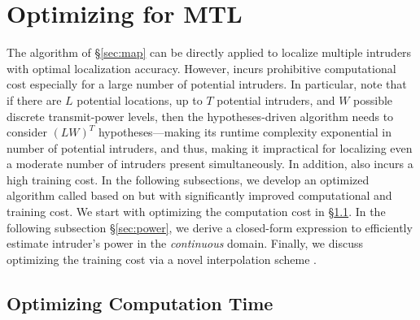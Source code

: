 \section{{\texorpdfstring{\ouralgo}: Optimizing \mll for MTL}}
\label{sec:map-time}
\label{sec:mtl}

The \map algorithm of \S\ref{sec:map} can be directly applied to
localize multiple intruders with optimal localization accuracy.
However, \map incurs prohibitive computational cost especially for a
large number of potential intruders.  In particular, note that if
there are $L$ potential locations, up to $T$ potential intruders, and
$W$ possible discrete transmit-power levels, then the
hypotheses-driven \map algorithm needs to consider $(LW)^T$
hypotheses---making its runtime complexity exponential in number of
potential intruders, and thus, making it impractical for localizing
even a moderate number of intruders present simultaneously.  In
addition, \mll also incurs a high training cost. In the following
subsections, we develop an optimized algorithm called \ouralgo based
on \map but with significantly improved computational and
training cost.
We start with optimizing the computation cost in \S\ref{sec:time}. In the following
  subsection \S\ref{sec:power}, we derive a closed-form expression
  to efficiently estimate intruder's power in the {\em continuous}
  domain.  Finally, we discuss optimizing the training cost via a
  novel interpolation scheme \ildw.


%

\subsection{Optimizing Computation Time}
\label{sec:time}

